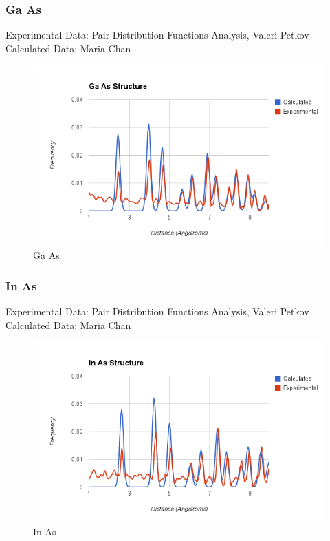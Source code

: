 \documentclass[12pt,letterpaper]{article}
\begin{document}
\subsubsection{Ga As}
\noindent Experimental Data: Pair Distribution Functions Analysis, Valeri
Petkov\\
\noindent Calculated Data: Maria Chan\\
\begin{figure}[ht]
  \begin{center}
    \includegraphics[scale=0.7]{figs/gaas_rdf_comparison.png}
    \caption{Ga As}
  \end{center}
\end{figure}

\subsubsection{In As}
\noindent Experimental Data: Pair Distribution Functions Analysis, Valeri
Petkov\\
\noindent Calculated Data: Maria Chan\\
\begin{figure}[ht]
  \begin{center}
    \includegraphics[scale=0.7]{figs/inas_rdf_comparison.png}
    \caption{In As}
  \end{center}
\end{figure}
\end{document}
